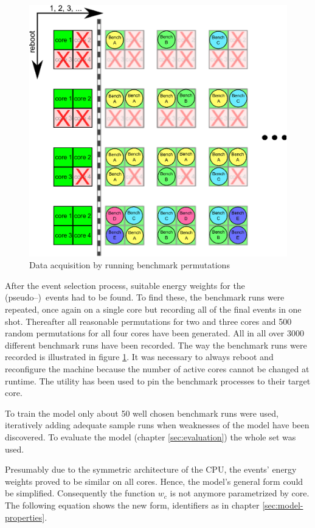 \begin{figure}
  \centering
    \includegraphics[width=\textwidth]{fig/run-benchmarks.eps}
  \caption{Data acquisition by running benchmark permutations}
  \label{fig:run-benchmarks}
\end{figure}

After the event selection process, suitable energy weights for the
(pseudo--)\ events had to be found. To find these, the benchmark runs were
repeated, once again on a single core but recording all of the final events in
one shot. Thereafter all reasonable permutations for two and three cores and 500
random permutations for all four cores have been generated. All in all over 3000
different benchmark runs have been recorded. The way the benchmark runs were
recorded is illustrated in figure \ref{fig:run-benchmarks}. It was necessary to
always reboot and reconfigure the machine because the number of active cores
cannot be changed at runtime. The \cite{man:taskset} utility has
been used to pin the benchmark processes to their target core.

To train the model only about 50 well chosen benchmark runs were used,
iteratively adding adequate sample runs when weaknesses of the model have been
discovered. To evaluate the model (chapter \ref{sec:evaluation}) the whole set
was used.

Presumably due to the symmetric architecture of the CPU, the events' energy
weights proved to be similar on all cores. Hence, the model's general form could
be simplified. Consequently the function $w_c$ is not anymore parametrized by
core. The following equation shows the new form, identifiers as in chapter
\ref{sec:model-properties}.

